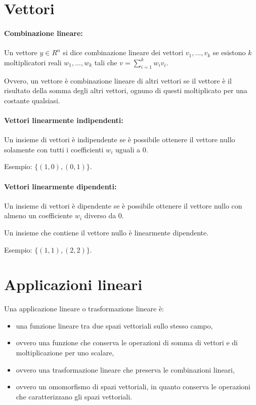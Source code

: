 \documentclass[a4paper]{article}
\begin{document}
        \section*{Vettori}

        \paragraph{Combinazione lineare:}
        Un vettore $y \in R^n$ si dice combinazione lineare dei vettori $v_1, ... , v_k$ se esistono $k$ moltiplicatori reali $w_1, ..., w_k$ tali che $v = \sum_{i=1}^{k} w_i v_i$.

        Ovvero, un vettore \`{e} combinazione lineare di altri vettori se il vettore \`{e} il risultato della somma degli altri vettori, ognuno di questi moltiplicato per una costante qualsiasi.

        \paragraph{Vettori linearmente indipendenti:}
        Un insieme di vettori \`{e} indipendente se \`{e} possibile ottenere il vettore nullo solamente con tutti i coefficienti $w_i$ uguali a $0$.

        Esempio: \quad $\{ (1, 0), (0, 1) \}$.

        \paragraph{Vettori linearmente dipendenti:}
        Un insieme di vettori \`{e} dipendente se \`{e} possibile ottenere il vettore nullo con almeno un coefficiente $w_i$ diverso da $0$.

        Un insieme che contiene il vettore nullo \`{e} linearmente dipendente.

        Esempio: \quad $\{ (1, 1), (2, 2) \}$.


        \section*{Applicazioni lineari}

        Una applicazione lineare o trasformazione lineare \`{e}:
        \begin{itemize}
                \item una funzione lineare tra due spazi vettoriali sullo stesso campo,
                \item ovvero una funzione che conserva le operazioni di somma di vettori e di moltiplicazione per uno scalare,
                \item ovvero una trasformazione lineare che preserva le combinazioni lineari,
                \item ovvero un omomorfismo di spazi vettoriali, in quanto conserva le operazioni che caratterizzano gli spazi vettoriali.
        \end{itemize}
\end{document}
